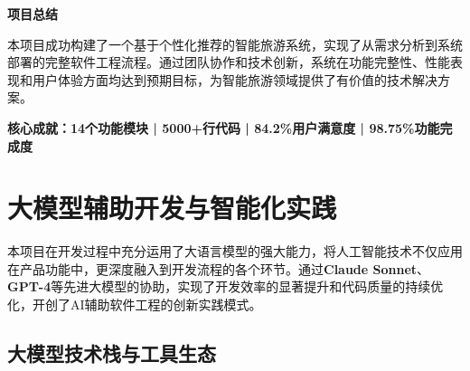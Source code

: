 \documentclass[12pt,a4paper]{article}
\begin{document}
\vfill

\begin{center}
\begin{tcolorbox}[
    colback=primary,
    coltext=white,
    halign=center,
    rounded corners=10pt,
    drop shadow,
    width=0.95\textwidth
]
\textbf{\LARGE 项目总结}\\[0.5cm]

\begin{minipage}{0.9\textwidth}
\centering
本项目成功构建了一个基于个性化推荐的智能旅游系统，实现了从需求分析到系统部署的完整软件工程流程。通过团队协作和技术创新，系统在功能完整性、性能表现和用户体验方面均达到预期目标，为智能旅游领域提供了有价值的技术解决方案。

\vspace{0.3cm}

\textcolor{accent}{\textbf{核心成就：14个功能模块 | 5000+行代码 | 84.2\%用户满意度 | 98.75\%功能完成度}}
\end{minipage}
\end{tcolorbox}
\end{center}

\section{大模型辅助开发与智能化实践}

\begin{infobox}[title={智能开发模式创新}]
本项目在开发过程中充分运用了大语言模型的强大能力，将人工智能技术不仅应用在产品功能中，更深度融入到开发流程的各个环节。通过\textcolor{primary}{\textbf{Claude Sonnet}}、\textcolor{secondary}{\textbf{GPT-4}}等先进大模型的协助，实现了开发效率的显著提升和代码质量的持续优化，开创了AI辅助软件工程的创新实践模式。
\end{infobox}

\subsection{大模型技术栈与工具生态}
\end{document}
